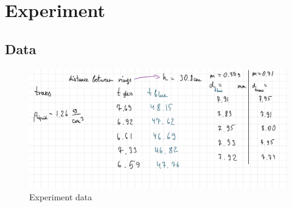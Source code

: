 \section{Experiment}

\subsection*{Data}
\begin{figure}[H]
	\centering
	\includegraphics[width=12cm]{schematics/data.png}
	\caption{Experiment data}
\end{figure}

